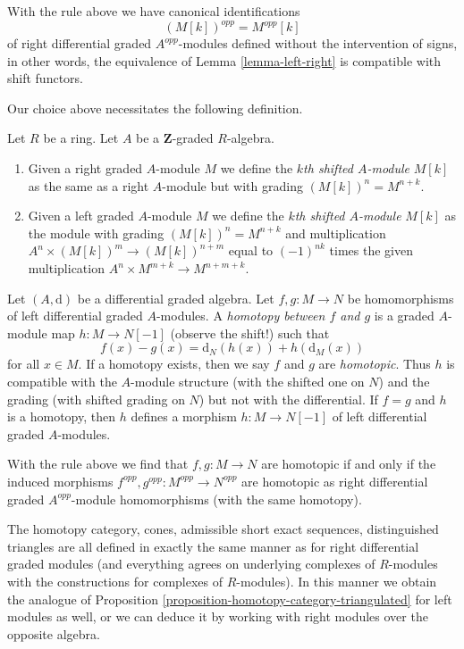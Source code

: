 \medskip\noindent
With the rule above we have canonical identifications
$$
(M[k])^{opp} = M^{opp}[k]
$$
of right differential graded $A^{opp}$-modules
defined without the intervention of signs, in other words, the equivalence
of Lemma \ref{lemma-left-right} is compatible with shift functors.

\medskip\noindent
Our choice above necessitates the following definition.

\begin{definition}
\label{definition-shift-graded-module}
Let $R$ be a ring. Let $A$ be a $\mathbf{Z}$-graded $R$-algebra.
\begin{enumerate}
\item Given a right graded $A$-module $M$ we define the
{\it $k$th shifted $A$-module} $M[k]$ as the same as
a right $A$-module but with grading $(M[k])^n = M^{n + k}$.
\item Given a left graded $A$-module $M$ we define the
{\it $k$th shifted $A$-module} $M[k]$ as the module
with grading $(M[k])^n = M^{n + k}$ and multiplication
$A^n \times (M[k])^m \to (M[k])^{n + m}$
equal to $(-1)^{nk}$ times the given multiplication
$A^n \times M^{m + k} \to M^{n + m + k}$.
\end{enumerate}
\end{definition}

\noindent
Let $(A, \text{d})$ be a differential graded algebra. Let
$f, g : M \to N$ be homomorphisms of left differential graded $A$-modules.
A {\it homotopy between $f$ and $g$} is a graded $A$-module map
$h : M \to N[-1]$ (observe the shift!) such that
$$
f(x) - g(x) = \text{d}_N(h(x)) + h(\text{d}_M(x))
$$
for all $x \in M$. If a homotopy exists, then we say $f$ and $g$ are
{\it homotopic}. Thus $h$ is compatible with the $A$-module structure
(with the shifted one on $N$) and the grading (with shifted grading on $N$)
but not with the differential. If $f = g$ and $h$ is a homotopy, then
$h$ defines a morphism $h : M \to N[-1]$ of left differential
graded $A$-modules.

\medskip\noindent
With the rule above we find that $f, g : M \to N$ are homotopic if
and only if the induced morphisms
$f^{opp}, g^{opp} : M^{opp} \to N^{opp}$
are homotopic as right differential graded $A^{opp}$-module homomorphisms
(with the same homotopy).

\medskip\noindent
The homotopy category, cones, admissible short exact sequences,
distinguished triangles are all defined in exactly the same manner
as for right differential graded modules (and everything agrees
on underlying complexes of $R$-modules with the constructions for
complexes of $R$-modules). In this manner we obtain the analogue of
Proposition \ref{proposition-homotopy-category-triangulated}
for left modules as well, or we can deduce it by working
with right modules over the opposite algebra.



